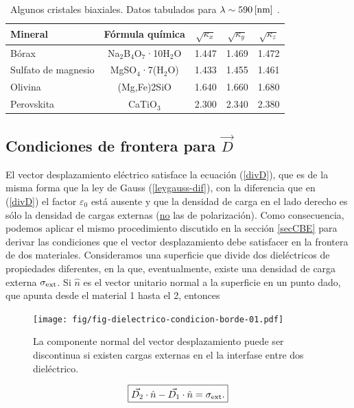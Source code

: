 \begin{table}[!h]
\begin{center}
\begin{tabular}{l c |c|c|c}
Mineral			& Fórmula química		& $\sqrt{\kappa_x}$	&	$\sqrt{\kappa_y}$	&  $\sqrt{\kappa_z}$	\\
\hline\hline
Bórax 	 		&Na$_2$B$_4$O$_7$·10H$_2$O& 	1.447	& 	1.469	& 	1.472	\\
Sulfato de magnesio		&  MgSO$_4$·7(H$_2$O)	& 	1.433	& 	1.455	& 	1.461	\\
Olivina			& 	(Mg,Fe)2SiO	& 	1.640	& 	1.660	& 	1.680	\\
Perovskita		& 	CaTiO$_3$	& 	2.300	& 	2.340	& 	2.380	%
\end{tabular}
\caption{Algunos cristales biaxiales. Datos tabulados para $\lambda\sim 590\,{\rm [nm]}$ \cite{hyper}.}
\end{center}
\end{table}
\subsection{Condiciones de frontera para $\vec{D}$}

El vector desplazamiento eléctrico satisface la ecuación (\ref{divD}), que es
de la misma forma que la ley de Gauss (\ref{leygauss-dif}), con la diferencia
que en (\ref{divD}) el factor $\varepsilon_0$ está ausente y que la densidad de carga en el lado derecho es sólo la densidad de cargas externas (\underline{no} las de polarización). Como consecuencia, podemos aplicar el mismo procedimiento discutido en la sección \ref{secCBE} para derivar las condiciones que el vector desplazamiento debe satisfacer en la frontera de dos materiales. Consideramos una superficie que divide dos dieléctricos de propiedades diferentes, en la que, eventualmente, existe una densidad de carga externa $\sigma_{\rm ext}$. Si $\hat{n}$ es el vector unitario normal a la superficie en un punto dado, que apunta desde el material 1 hasta el 2, entonces
\begin{figure}[!h]
\centerline{\texttt{[image: fig/fig-dielectrico-condicion-borde-01.pdf]}}
\caption{La componente normal del vector desplazamiento puede ser discontinua
si existen cargas externas en el la interfase entre dos dieléctrico.}
\label{CF1}
\end{figure}
\begin{equation}\label{saltoDn}
\boxed{\vec{D_2}\cdot\hat{n}-\vec{D_1}\cdot\hat{n}=\sigma_{\rm
ext}.}
\end{equation}

